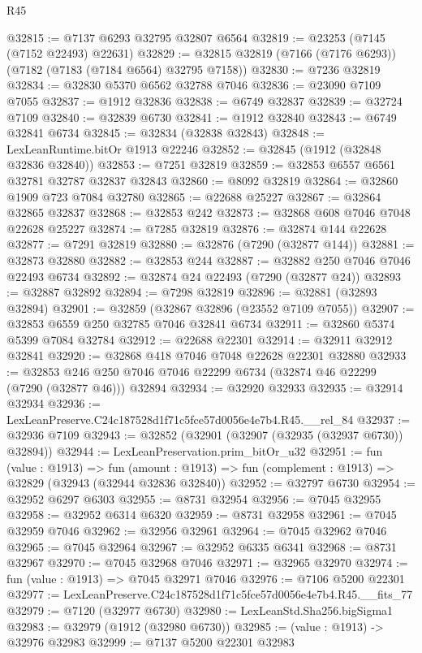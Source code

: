 \begin{lexlean}{R45}
\begin{coremodule}
{@32815 := @7137 @6293 @32795 @32807 @6564
@32819 := @23253 (@7145 (@7152 @22493) @22631)
@32829 := @32815 @32819 (@7166 (@7176 @6293)) (@7182 (@7183 (@7184 @6564) @32795 @7158))
@32830 := @7236 @32819
@32834 := @32830 @5370 @6562 @32788 @7046
@32836 := @23090 @7109 @7055
@32837 := @1912 @32836
@32838 := @6749 @32837
@32839 := @32724 @7109
@32840 := @32839 @6730
@32841 := @1912 @32840
@32843 := @6749 @32841 @6734
@32845 := @32834 (@32838 @32843)
@32848 := LexLeanRuntime.bitOr @1913 @22246
@32852 := @32845 (@1912 (@32848 @32836 @32840))
@32853 := @7251 @32819
@32859 := @32853 @6557 @6561 @32781 @32787 @32837 @32843
@32860 := @8092 @32819
@32864 := @32860 @1909 @723 @7084 @32780
@32865 := @22688 @25227
@32867 := @32864 @32865 @32837
@32868 := @32853 @242
@32873 := @32868 @608 @7046 @7048 @22628 @25227
@32874 := @7285 @32819
@32876 := @32874 @144 @22628
@32877 := @7291 @32819
@32880 := @32876 (@7290 (@32877 @144))
@32881 := @32873 @32880
@32882 := @32853 @244
@32887 := @32882 @250 @7046 @7046 @22493 @6734
@32892 := @32874 @24 @22493 (@7290 (@32877 @24))
@32893 := @32887 @32892
@32894 := @7298 @32819
@32896 := @32881 (@32893 @32894)
@32901 := @32859 (@32867 @32896 (@23552 @7109 @7055))
@32907 := @32853 @6559 @250 @32785 @7046 @32841 @6734
@32911 := @32860 @5374 @5399 @7084 @32784
@32912 := @22688 @22301
@32914 := @32911 @32912 @32841
@32920 := @32868 @418 @7046 @7048 @22628 @22301 @32880
@32933 := @32853 @246 @250 @7046 @7046 @22299 @6734 (@32874 @46 @22299 (@7290 (@32877 @46))) @32894
@32934 := @32920 @32933
@32935 := @32914 @32934
@32936 := LexLeanPreserve.C24c187528d1f71c5fce57d0056e4e7b4.R45.__rel_84
@32937 := @32936 @7109
@32943 := @32852 (@32901 (@32907 (@32935 (@32937 @6730)) @32894))
@32944 := LexLeanPreservation.prim_bitOr_u32
@32951 := fun (value : @1913) =>
  fun (amount : @1913) => fun (complement : @1913) => @32829 (@32943 (@32944 @32836 @32840))
@32952 := @32797 @6730
@32954 := @32952 @6297 @6303
@32955 := @8731 @32954
@32956 := @7045 @32955
@32958 := @32952 @6314 @6320
@32959 := @8731 @32958
@32961 := @7045 @32959 @7046
@32962 := @32956 @32961
@32964 := @7045 @32962 @7046
@32965 := @7045 @32964
@32967 := @32952 @6335 @6341
@32968 := @8731 @32967
@32970 := @7045 @32968 @7046
@32971 := @32965 @32970
@32974 := fun (value : @1913) => @7045 @32971 @7046
@32976 := @7106 @5200 @22301
@32977 := LexLeanPreserve.C24c187528d1f71c5fce57d0056e4e7b4.R45.__fits_77
@32979 := @7120 (@32977 @6730)
@32980 := LexLeanStd.Sha256.bigSigma1
@32983 := @32979 (@1912 (@32980 @6730))
@32985 := (value : @1913) -> @32976 @32983
@32999 := @7137
    @5200
    @22301
    @32983
}
\end{coremodule}
\end{lexlean}
